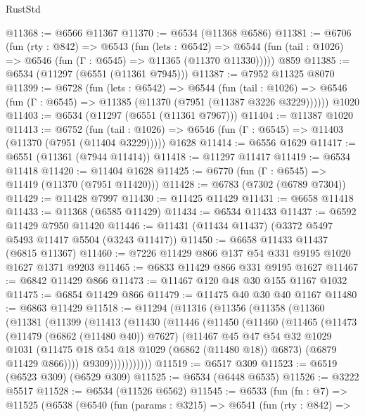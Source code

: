 \begin{lexlean}{RustStd}
\begin{coremodule}
@11368 := @6566 @11367
@11370 := @6534 (@11368 @6586)
@11381 := @6706
    (fun (rty : @842) =>
    @6543
      (fun (lets : @6542) =>
      @6544 (fun (tail : @1026) => @6546 (fun (Γ : @6545) => @11365 (@11370 @11330)))))
    @859
@11385 := @6534 (@11297 (@6551 (@11361 @7945)))
@11387 := @7952 @11325 @8070
@11399 := @6728
    (fun (lets : @6542) =>
    @6544
      (fun (tail : @1026) =>
      @6546 (fun (Γ : @6545) => @11385 (@11370 (@7951 (@11387 @3226 @3229))))))
    @1020
@11403 := @6534 (@11297 (@6551 (@11361 @7967)))
@11404 := @11387 @1020
@11413 := @6752
    (fun (tail : @1026) => @6546 (fun (Γ : @6545) => @11403 (@11370 (@7951 (@11404 @3229)))))
    @1628
@11414 := @6556 @1629
@11417 := @6551 (@11361 (@7944 @11414))
@11418 := @11297 @11417
@11419 := @6534 @11418
@11420 := @11404 @1628
@11425 := @6770 (fun (Γ : @6545) => @11419 (@11370 (@7951 @11420)))
@11428 := @6783 (@7302 (@6789 @7304))
@11429 := @11428 @7997
@11430 := @11425 @11429
@11431 := @6658 @11418
@11433 := @11368 (@6585 @11429)
@11434 := @6534 @11433
@11437 := @6592 @11429 @7950 @11420
@11446 := @11431 (@11434 @11437) (@3372 @5497 @5493 @11417 @5504 (@3243 @11417))
@11450 := @6658 @11433 @11437 (@6815 @11367)
@11460 := @7226 @11429 @866 @137 @54 @331 @9195 @1020 @1627 @1371 @9203
@11465 := @6833 @11429 @866 @331 @9195 @1627
@11467 := @6842 @11429 @866
@11473 := @11467 @120 @48 @30 @155 @1167 @1032
@11475 := @6854 @11429 @866
@11479 := @11475 @40 @30 @40 @1167
@11480 := @6863 @11429
@11518 := @11294
    (@11316
      (@11356
        (@11358
          (@11360
            (@11381
              (@11399
                (@11413
                  (@11430
                    (@11446
                      (@11450
                        (@11460
                          (@11465
                            (@11473
                              (@11479 (@6862 (@11480 @40)) @7627)
                              (@11467
                                @45
                                @47
                                @54
                                @32
                                @1029
                                @1031
                                (@11475 @18 @54 @18 @1029 (@6862 (@11480 @18)) @6873)
                                (@6879 @11429 @866))))
                          @9309)))))))))))
@11519 := @6517 @309
@11523 := @6519 (@6523 @309) (@6529 @309)
@11525 := @6534 (@6448 @6535)
@11526 := @3222 @5517
@11528 := @6534 (@11526 @6562)
@11545 := @6533
    (fun (fn : @7) =>
    @11525
      (@6538
        (@6540
          (fun (params : @3215) =>
          @6541
            (fun (rty : @842) =>

\end{coremodule}
\end{lexlean}
